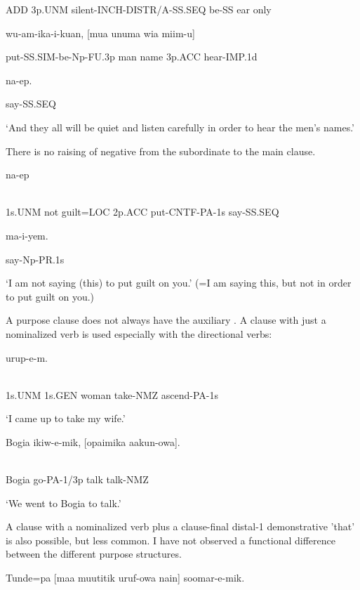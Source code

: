 ADD  3p.UNM  silent-INCH-DISTR/A-SS.SEQ  be-SS  ear  only

wu-am-ika-i-kuan,  [mua  unuma  wia  miim-u]

put-SS.SIM-be-Np-FU.3p  man  name  3p.ACC  hear-IMP.1d

na-ep.

say-SS.SEQ

`And they all will be quiet and listen carefully in order to hear the men's names.'

There is no raising of negative from the subordinate to the main clause. 

\ea%
\label{ex:x1623}
\gll [Yo  me  pina=pa  nia  wu-ek-a-m]  na-ep \\
      \\
\glt
\z

1s.UNM  not  guilt=LOC  2p.ACC  put-CNTF-PA-1s  say-SS.SEQ

ma-i-yem.

say-Np-PR.1s

`I am not saying (this) to put guilt on you.' (=I am saying this, but not in order to put guilt on you.)

A purpose clause does not always have the auxiliary . A clause with just a nominalized verb is used especially with the directional verbs: 

\ea%
\label{ex:x1659}
  urup-e-m. \\
      \\
\glt
\z

1s.UNM  1s.GEN  woman  take-NMZ  ascend-PA-1s

`I came up to take my wife.'

\ea%
\label{ex:x1658}
\gll Bogia  ikiw-e-mik,  [opaimika  aakun-owa]. \\
      \\
\glt
\z

Bogia  go-PA-1/3p  talk  talk-NMZ

`We went to Bogia to talk.'

A clause with a nominalized verb plus a clause-final distal-1 demonstrative  'that' is also possible, but less common. I have not observed a functional difference between the different purpose structures.

\ea%
\label{ex:x1633}
\gll Tunde=pa  [maa  muutitik  uruf-owa  nain]  soomar-e-mik. \\
      \\
\glt
\z

